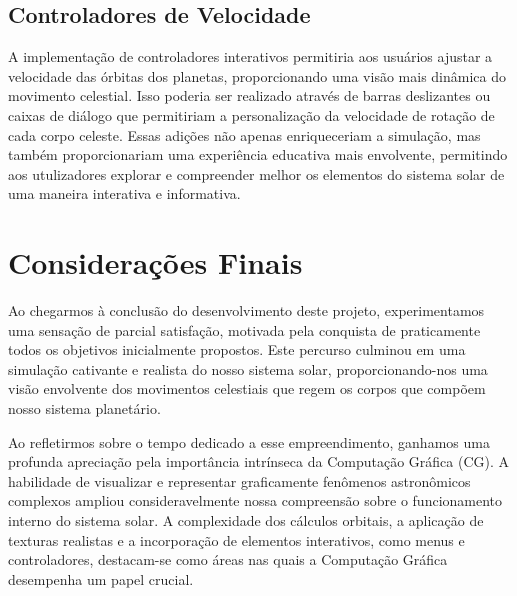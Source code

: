 \documentclass[12pt,a4paper]{memoir}
\begin{document}
\section{Controladores de Velocidade}
A implementação de controladores interativos permitiria aos usuários ajustar a velocidade das órbitas dos planetas, proporcionando uma visão mais dinâmica do movimento celestial. Isso poderia ser realizado através de barras deslizantes ou caixas de diálogo que permitiriam a personalização da velocidade de rotação de cada corpo celeste.
Essas adições não apenas enriqueceriam a simulação, mas também proporcionariam uma experiência educativa mais envolvente, permitindo aos utulizadores explorar e compreender melhor os elementos do sistema solar de uma maneira interativa e informativa.

\chapter{Considerações Finais}

Ao chegarmos à conclusão do desenvolvimento deste projeto, experimentamos uma sensação de parcial satisfação, motivada pela conquista de praticamente todos os objetivos inicialmente propostos. Este percurso culminou em uma simulação cativante e realista do nosso sistema solar, proporcionando-nos uma visão envolvente dos movimentos celestiais que regem os corpos que compõem nosso sistema planetário.

Ao refletirmos sobre o tempo dedicado a esse empreendimento, ganhamos uma profunda apreciação pela importância intrínseca da Computação Gráfica (CG). A habilidade de visualizar e representar graficamente fenômenos astronômicos complexos ampliou consideravelmente nossa compreensão sobre o funcionamento interno do sistema solar. A complexidade dos cálculos orbitais, a aplicação de texturas realistas e a incorporação de elementos interativos, como menus e controladores, destacam-se como áreas nas quais a Computação Gráfica desempenha um papel crucial.

\clearpage{\thispagestyle{empty}\cleardoublepage}

\backmatter
\newpage





\nocite{UBI}
\nocite{ERD}
\end{document}
